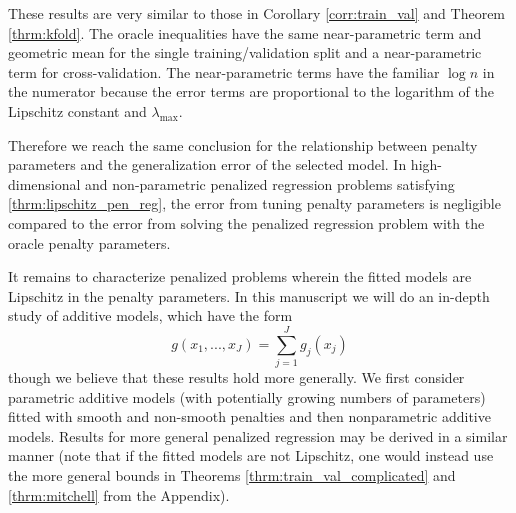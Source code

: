 \documentclass[12pt]{article} %
\theoremstyle{definition}
\begin{document}
These results are very similar to those in Corollary \ref{corr:train_val} and Theorem \ref{thrm:kfold}. The oracle inequalities have the same near-parametric term and geometric mean for the single training/validation split and a near-parametric term for cross-validation. The near-parametric terms have the familiar $\log n$ in the numerator because the error terms are proportional to the logarithm of the Lipschitz constant and $\lambda_{\max}$. 

Therefore we reach the same conclusion for the relationship between penalty parameters and the generalization error of the selected model. In high-dimensional and non-parametric penalized regression problems satisfying \eqref{thrm:lipschitz_pen_reg}, the error from tuning penalty parameters is negligible compared to the error from solving the penalized regression problem with the oracle penalty parameters.

It remains to characterize penalized problems wherein the fitted models are Lipschitz in the penalty parameters. In this manuscript we will do an in-depth study of additive models, which have the form
\begin{equation}
g(x_1, ..., x_J)= \sum_{j=1}^J g_j(x_j)
\end{equation}
though we believe that these results hold more generally. We first consider parametric additive models (with potentially growing numbers of parameters) fitted with smooth and non-smooth penalties and then nonparametric additive models. Results for more general penalized regression may be derived in a similar manner (note that if the fitted models are not Lipschitz, one would instead use the more general bounds in Theorems \ref{thrm:train_val_complicated} and \ref{thrm:mitchell} from the Appendix).
\end{document}
